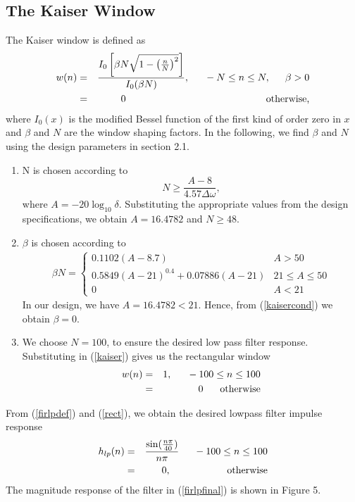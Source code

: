 \documentclass{article}
\begin{document}
\subsection{The Kaiser Window}
The Kaiser window is defined as
\begin{eqnarray}
\label{kaiser}
w(n) &=& \frac{I_0\left[ \beta N \sqrt{1 - \left(\frac{n}{N}\right)^2} \right]}{I_0(\beta N)},
\indent -N \leq n \leq N, \indent \beta > 0 \nonumber \\
&=& 0 \hspace{5cm} \mbox{otherwise,}
\end{eqnarray}
where $I_0(x)$ is the modified Bessel function of the first kind of order zero in $x$ and $\beta$
and $N$ are the window shaping factors.  In the following,
we find $\beta$ and $N$ using the design parameters in section 2.1.

\begin{enumerate}
\item  N is chosen according to
\begin{equation}
N \geq \frac{A-8}{4.57\Delta \omega},
\end{equation}
where $A = -20\log_{10}\delta$.  Substituting the appropriate values from the design specifications, we obtain
$A = 16.4782$ and $N \geq 48$.

\item  $\beta$ is chosen according to
\begin{eqnarray}
\label{kaisercond}
\beta N = \left\{ \begin{array}{ll} 0.1102(A-8.7) & A > 50 \\
0.5849(A-21)^{0.4}+ 0.07886(A-21) & 21 \leq A \leq 50 \\
0 & A < 21\end{array} \right.
\end{eqnarray}
In our design, we have $A = 16.4782 < 21$.  Hence, from (\ref{kaisercond}) we obtain $\beta = 0$.  

\item We choose $N = 100$, to ensure the desired low pass filter response.  Substituting in (\ref{kaiser})
gives us the rectangular window
\begin{eqnarray}
\label{rect}
w(n) &=& 1, \indent -100 \leq n \leq 100 \nonumber \\
&=& 0 \hspace{6mm} \mbox{otherwise}
\end{eqnarray}
\end{enumerate}

From (\ref{firlpdef}) and (\ref{rect}), we obtain the desired lowpass filter impulse response
\begin{eqnarray}
\label{firlpfinal}
h_{lp}(n) &=& \frac{\sin(\frac{n\pi}{40})}{n\pi} \indent -100 \leq n \leq 100 \nonumber \\
&=& 0, \hspace{2cm} \mbox{otherwise}
\end{eqnarray}
The magnitude  response of the filter in (\ref{firlpfinal}) is shown in Figure 5.
\end{document}
